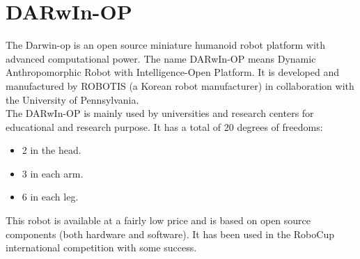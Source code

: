 \documentclass[a4paper, 12pt]{article}  		%
\begin{document}

\newpage
\thispagestyle{empty}
\setcounter{page}{0}

\begin{spacing}{0.9}
\tableofcontents
\thispagestyle{empty}
\end{spacing}


\newpage
\section{DARwIn-OP}
The Darwin-op is an open source miniature humanoid robot platform with advanced computational power. The name DARwIn-OP means Dynamic Anthropomorphic Robot with Intelligence-Open Platform. It is developed and manufactured by ROBOTIS (a Korean robot manufacturer) in collaboration with the University of Pennsylvania.\\

The DARwIn-OP is mainly used by universities and research centers for educational and research purpose. It has a total of 20 degrees of freedoms:
\begin{itemize}
\item 2 in the head.
\item 3 in each arm.
\item 6 in each leg.
\end{itemize}

This robot is available at a fairly low price and is based on open source components (both hardware and software). It has been used in the RoboCup international competition with some success.\\
\end{document}
